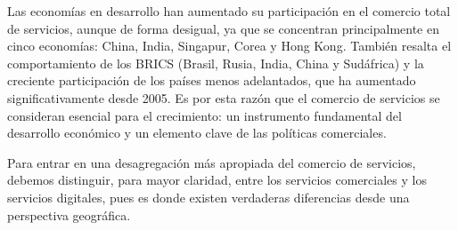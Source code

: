 \documentclass[10pt,a4paper]{article}
\begin{document}
Las economías en desarrollo han aumentado su participación en el comercio total de servicios, aunque de forma desigual, ya que se concentran principalmente en cinco economías: China, India, Singapur, Corea y Hong Kong. También resalta el comportamiento de los BRICS (Brasil, Rusia, India, China y Sudáfrica) y la creciente participación de los países menos adelantados, que ha aumentado significativamente desde 2005. Es por esta razón que el comercio de servicios se consideran esencial para el crecimiento: un instrumento fundamental del desarrollo económico y un elemento clave de las políticas comerciales. 

Para entrar en una desagregación más apropiada del comercio de servicios, debemos distinguir, para mayor claridad, entre los servicios comerciales y los servicios digitales, pues es donde existen verdaderas diferencias desde una perspectiva geográfica.
\end{document}
